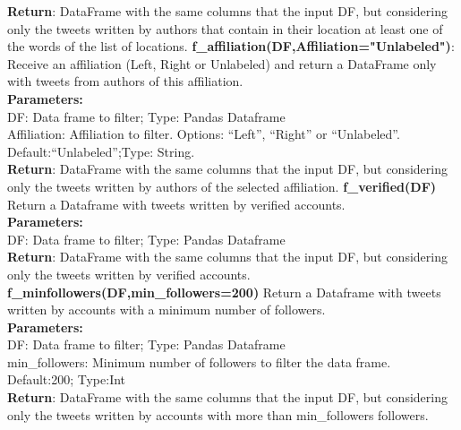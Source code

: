 \textbf{Return}: DataFrame with the same columns that the input DF, but considering only the tweets written by authors that contain in their location at least one of the words of the list of locations.
\newline 
\newline
\noindent\textbf{f\_affiliation(DF,Affiliation="Unlabeled")}:
Receive an affiliation (Left, Right or Unlabeled) and return a DataFrame only with tweets from authors of this affiliation.\\
\textbf{Parameters:}\\
DF: Data frame to filter; Type: Pandas Dataframe\\
Affiliation: Affiliation to filter. Options: “Left”, “Right” or “Unlabeled”. Default:“Unlabeled”;Type: String.\\
\textbf{Return}: DataFrame with the same columns that the input DF, but considering only the tweets written by authors of the selected affiliation.
\newline 
\newline
\noindent\textbf{f\_verified(DF)}
Return a Dataframe with tweets written by verified accounts.\\
\textbf{Parameters:}\\
DF: Data frame to filter; Type: Pandas Dataframe\\
\textbf{Return}: DataFrame with the same columns that the input DF, but considering only the tweets written by verified accounts.
\newline 
\newline
\noindent\textbf{f\_minfollowers(DF,min\_followers=200)}
Return a Dataframe with tweets written by accounts with a minimum number of followers.\\
\textbf{Parameters:}\\
DF: Data frame to filter; Type: Pandas Dataframe\\
min\_followers: Minimum number of followers to filter the data frame. Default:200; Type:Int\\
\textbf{Return}: DataFrame with the same columns that the input DF, but considering only the tweets written by accounts with more than min\_followers followers.

